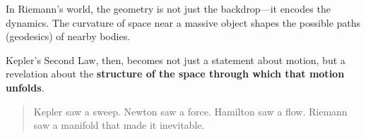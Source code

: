 In Riemann’s world, the geometry is not just the backdrop—it encodes the dynamics.  
The curvature of space near a massive object shapes the possible paths (geodesics) of nearby bodies.

Kepler’s Second Law, then, becomes not just a statement about motion,  
but a revelation about the \textbf{structure of the space through which that motion unfolds}.

\bigskip

\begin{quote}
Kepler saw a sweep.  
Newton saw a force.  
Hamilton saw a flow.  
Riemann saw a manifold that made it inevitable.
\end{quote}
